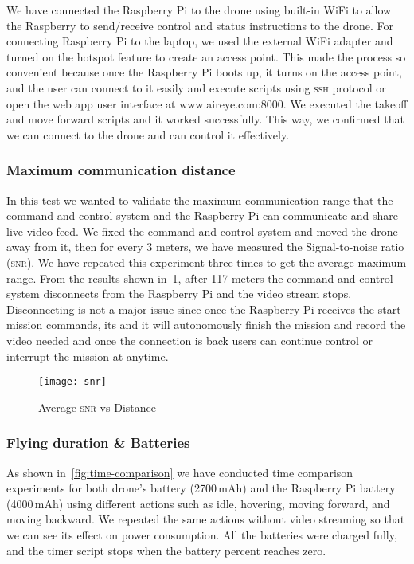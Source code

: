 \documentclass[../main.tex]{subfiles}
\begin{document}
We have connected the
Raspberry Pi to the drone using built-in WiFi
to allow the Raspberry to send/receive control and status 
instructions to the drone. 
For connecting Raspberry Pi to the laptop, 
we used the external WiFi adapter and turned 
on the hotspot feature to create an access point.
This made the process so convenient because 
once the Raspberry Pi boots up, it turns on the 
access point, and the user can connect to it 
easily and execute scripts using \textsc{ssh} 
protocol or open the web app user interface 
at www.aireye.com:8000. We executed the takeoff 
and move forward scripts and it worked successfully.
This way, we confirmed that we can connect to the drone and can control it effectively.

\subsubsection{Maximum communication distance}

In this test we wanted to validate the maximum communication range that
the command and control system and the Raspberry Pi can communicate
and share live video feed. We fixed the command and control system and moved
the drone away from it, then for every 3 meters, we have 
measured the Signal-to-noise ratio (\textsc{snr}).
We have repeated this experiment three times to get the average maximum range.
From the results shown in~\cref{fig:snr-vs-distance}, after 117 meters 
the command and control system disconnects from the Raspberry Pi
and the video stream stops. Disconnecting is not a major issue
since once the Raspberry Pi receives the start mission commands, its 
and it will autonomously finish the mission and record the video needed
and once the connection is back users can continue control or interrupt the mission
at anytime.
 
\begin{figure}[tbp]
	\centering
	\texttt{[image: snr]}
        \caption{Average \textsc{snr} vs Distance}
	\label{fig:snr-vs-distance}
\end{figure}

\subsubsection{Flying duration \& Batteries}

As shown in~\cref{fig:time-comparison} we have 
conducted time comparison experiments for both drone's
battery (2700\,mAh) and the Raspberry Pi battery (4000\,mAh) 
using different actions such as idle, hovering, 
moving forward, and moving backward. We repeated 
the same actions without video streaming so that 
we can see its effect on power consumption. 
All the batteries were charged fully, and the timer 
script stops when the battery percent reaches zero. 
\end{document}
